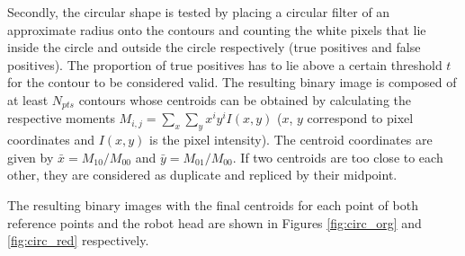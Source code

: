 Secondly, the circular shape is tested by placing a circular filter of an approximate radius onto the contours and counting the white pixels that lie inside the circle and outside the circle respectively (true positives and false positives). 
The proportion of true positives has to lie above a certain threshold $t$ for the contour to be considered valid.  
The resulting binary image is composed of at least $N_{pts}$ contours whose centroids can be obtained by calculating the respective moments $M_{i,j}=\sum_{x} \sum_{y} x^iy^i I(x,y)$ ($x$, $y$ correspond to pixel coordinates and $I(x,y)$ is the pixel intensity). 
The centroid coordinates are given by $\bar{x}=M_{10}/M_{00}$ and $\bar{y}=M_{01}/M_{00}$. If two centroids are too close to each other, they are considered as duplicate and repliced by their midpoint.

The resulting binary images with the final centroids for each point of both reference points and the robot head are shown in Figures \ref{fig:circ_org} and \ref{fig:circ_red} respectively.


